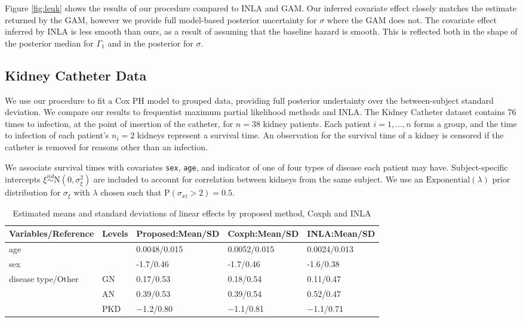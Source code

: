 \documentclass[]{article}
\begin{document}
Figure \ref{fig:leuk} shows the results of our procedure compared to INLA and GAM. Our inferred covariate effect closely matches the estimate returned by the GAM, however we provide full model-based posterior uncertainty for $\sigma$ where the GAM does not. The covariate effect inferred by INLA is less smooth than ours, as a result of assuming that the baseline hazard is smooth. This is reflected both in the shape of the posterior median for $\Gamma_{1}$ and in the posterior for $\sigma$.

\subsection{Kidney Catheter Data}

We use our procedure to fit a Cox PH model to grouped data, providing full posterior undertainty over the between-subject standard deviation. We compare our results to frequentist maximum partial likelihood methods and INLA. The Kidney Catheter dataset contains 76 times to infection, at the point of insertion of the catheter, for $n = 38$  kidney patients. Each patient $i=1,\ldots,n$ forms a group, and the time to infection of each patient's $n_{i} = 2$ kidneys represent a survival time. An observation for the survival time of a kidney is censored if the catheter is removed for reasons other than an infection. 

We associate survival times with covariates \texttt{sex}, \texttt{age}, and indicator of one of four types of disease each patient may have. Subject-specific intercepts $\xi\overset{iid}{\sim}\text{N}(0,\sigma^{2}_{\xi})$ are included to account for correlation between kidneys from the same subject. We use an $\text{Exponential}(\lambda)$ prior distribution for $\sigma_{\xi}$ with $\lambda$ chosen such that $\text{P}(\sigma_{xi} > 2) = 0.5$.

\begin{table}[ht]
\centering
\begin{tabular}{ |p{3cm} p{3cm}|p{3cm} p{3cm} p{3cm}|}
 \hline
 Variables/Reference & Levels & Proposed:Mean/SD & Coxph:Mean/SD &INLA:Mean/SD \\
 \hline
 age & & 0.0048/0.015 & 0.0052/0.015 & 0.0024/0.013\\
 sex & & -1.7/0.46  & -1.7/0.46 &  -1.6/0.38\\
 disease type/Other & GN & 0.17/0.53 &  0.18/0.54 & 0.11/0.47\\
  & AN & 0.39/0.53 & 0.39/0.54 & 0.52/0.47\\
  & PKD & −1.2/0.80  & −1.1/0.81 & −1.1/0.71\\
\hline
\end{tabular}
\caption{Estimated means and standard deviations of linear effects by proposed method, Coxph and INLA}
\label{table:KidneyFixed}
\end{table}
\end{document}
